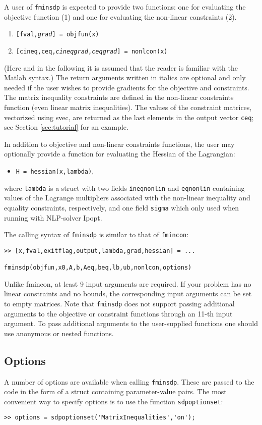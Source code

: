 \documentclass{article}
\newcommand{\svec}{\mbox{\textsf{svec}}}
\begin{document}
A user of \texttt{fminsdp} is expected to provide two functions: one for evaluating the objective function (1) and one for evaluating the non-linear constraints (2).
\begin{enumerate}
\item \texttt{[fval,\textit{grad}] = objfun(x)}
\item \texttt{[cineq,ceq,\textit{cineqgrad},\textit{ceqgrad}] = nonlcon(x)}
\end{enumerate}
(Here and in the following it is assumed that the reader is familiar with the Matlab syntax.) The return arguments written in italics are optional and only needed if the user wishes to provide gradients for the objective and constraints. The matrix inequality constraints are defined in the non-linear constraints function (even linear matrix inequalities). The values of the constraint matrices, vectorized using \svec, are returned as the last elements in the output vector \texttt{ceq}; see Section \ref{sec:tutorial} for an example.

In addition to objective and non-linear constraints functions, the user may optionally provide a function for evaluating
the Hessian of the Lagrangian:
\begin{itemize}
\item \texttt{H = hessian(x,lambda)},
\end{itemize}
where \texttt{lambda} is a struct with two fields \texttt{ineqnonlin} and \texttt{eqnonlin} containing values of the Lagrange
multipliers associated with the non-linear inequality and equality constraints, respectively, and one field \texttt{sigma} 
which only used when running with NLP-solver Ipopt.

The calling syntax of \texttt{fminsdp} is similar to that of \texttt{fmincon}:
\begin{verbatim}
>> [x,fval,exitflag,output,lambda,grad,hessian] = ...
										                        fminsdp(objfun,x0,A,b,Aeq,beq,lb,ub,nonlcon,options)
\end{verbatim}
Unlike fmincon, at least 9 input arguments are required. If your problem has no linear constraints and no 
bounds, the corresponding input arguments can be set to empty matrices. Note that \texttt{fminsdp} does not
support passing additional arguments to the objective or constraint functions through an 11-th input argument. 
To pass additional arguments to the user-supplied functions one should use anonymous or nested functions.

\subsection{Options}
A number of options are available when calling \texttt{fminsdp}. These are passed to the code in the form of a struct containing
parameter-value pairs. The most convenient way to specify options is to use the function \texttt{sdpoptionset}:
\begin{verbatim}
>> options = sdpoptionset('MatrixInequalities','on');
\end{verbatim}
\end{document}
